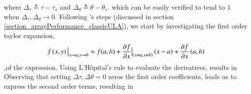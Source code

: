 where $ \Delta_{\tau} \triangleq \tau-\tau_{s} $ and $ \Delta_{\theta} \triangleq \theta-\theta_{s}$.
which can be easily verified to tend to $ 1 $ when $ \Delta_{\tau},\Delta_{\theta} \rightarrow 0$. 
Following \cite{VanTrees2002DetectionIV}'s steps (discussed in section \ref{section_arrayPerformance_classicULA}), we start by investigating the first order taylor expansion,$$ \evalat{f\left(x,y\right)}{x\to{}a,y\to{}b} \approx f(a,b) + \evalat{\frac{\partial{f}}{\partial{x}}}{\left(x=a,x=b\right)}\left(x-a\right) + \frac{\partial{f}}{\partial{x}}\left(a,b\right) $$,of the expression.
Using L'Hôpital's rule to evaluate the derivatives, results in 
Observing that setting $\Delta{\tau},\Delta{\theta} = 0$ zeros the first order coefficients, leads us to express the second order terms, resulting in 
